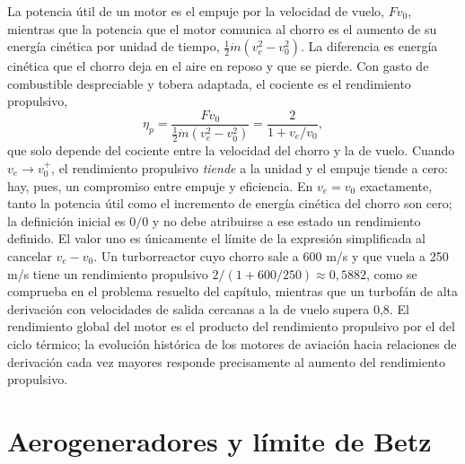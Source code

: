 \documentclass[10pt,openany]{book}
\begin{document}
La potencia útil de un motor es el empuje por la velocidad de vuelo, \(F v_0\), mientras que la potencia que el motor comunica al chorro es el aumento de su energía cinética por unidad de tiempo, \(\tfrac12\dot m(v_e^{2} - v_0^{2})\). La diferencia es energía cinética que el chorro deja en el aire en reposo y que se pierde. Con gasto de combustible despreciable y tobera adaptada, el cociente es el rendimiento propulsivo,
\begin{equation}
\eta_p = \frac{F v_0}{\tfrac12\dot m\left(v_e^{2} - v_0^{2}\right)} = \frac{2}{1 + v_e/v_0}, \label{eq:c09-rendimiento}
\end{equation}
que solo depende del cociente entre la velocidad del chorro y la de vuelo. Cuando \(v_e\to v_0^+\), el rendimiento propulsivo \emph{tiende} a la unidad y el empuje tiende a cero: hay, pues, un compromiso entre empuje y eficiencia. En \(v_e=v_0\) exactamente, tanto la potencia útil como el incremento de energía cinética del chorro son cero; la definición inicial es \(0/0\) y no debe atribuirse a ese estado un rendimiento definido. El valor uno es únicamente el límite de la expresión simplificada al cancelar \(v_e-v_0\). Un turborreactor cuyo chorro sale a 600 m/s y que vuela a 250 m/s tiene un rendimiento propulsivo \(2/(1 + 600/250) \approx 0{,}5882\), como se comprueba en el problema resuelto del capítulo, mientras que un turbofán de alta derivación con velocidades de salida cercanas a la de vuelo supera 0,8. El rendimiento global del motor es el producto del rendimiento propulsivo por el del ciclo térmico; la evolución histórica de los motores de aviación hacia relaciones de derivación cada vez mayores responde precisamente al aumento del rendimiento propulsivo.

\section{Aerogeneradores y límite de Betz}
\end{document}
